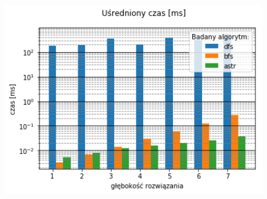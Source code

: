 \documentclass{classrep}
\begin{document}
\begin{figure}[H]
  \centering
  \begin{minipage}{0.45\textwidth}
    \centering
    \includegraphics[width=1.1\textwidth]{output_3_4.png}
  \end{minipage}
\end{figure}

\end{document}
